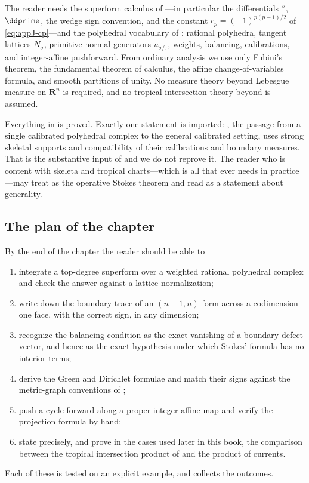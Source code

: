 The reader needs the superform calculus of ---in
particular the differentials $\dprime$, $\ddprime$, the wedge sign
convention, and the constant $c_p=(-1)^{p(p-1)/2}$ of
\eqref{eq:appJ-cp}---and the polyhedral vocabulary of
: rational polyhedra, tangent lattices
$N_\sigma$, primitive normal generators $u_{\sigma/\tau}$, weights,
balancing, calibrations, and integer-affine pushforward.  From ordinary
analysis we use only Fubini's theorem, the fundamental theorem of calculus,
the affine change-of-variables formula, and smooth partitions of unity.  No
measure theory beyond Lebesgue measure on $\mathbf R^n$ is required, and no
tropical intersection theory beyond
 is assumed.

Everything in
is proved.  Exactly one statement is imported:
, the passage from a single calibrated
polyhedral complex to the general calibrated setting, uses strong
skeletal supports and compatibility of their calibrations and boundary
measures.  That is the substantive input of
\cite[\S\S4.6 and 5.11]{CLD25} and we do
not reprove it.  The reader who is content with skeleta and tropical
charts---which is all that
 ever needs in
practice---may treat  as the operative Stokes
theorem and read  as a statement about
generality.

\subsection{The plan of the chapter}
\label{sec:ch11-plan}

By the end of the chapter the reader should be able to
\begin{enumerate}
\item integrate a top-degree superform over a weighted rational polyhedral
  complex and check the answer against a lattice normalization;
\item write down the boundary trace of an $(n-1,n)$-form across a
  codimension-one face, with the correct sign, in any dimension;
\item recognize the balancing condition as the exact vanishing of a boundary
  defect vector, and hence as the exact hypothesis under which Stokes'
  formula has no interior terms;
\item derive the Green and Dirichlet formulae and match their signs against
  the metric-graph conventions of ;
\item push a cycle forward along a proper integer-affine map and verify the
  projection formula by hand;
\item state precisely, and prove in the cases used later in this book, the
  comparison between the tropical intersection product of
   and the product of currents.
\end{enumerate}
Each of these is tested on an explicit example, and
 collects the outcomes.

